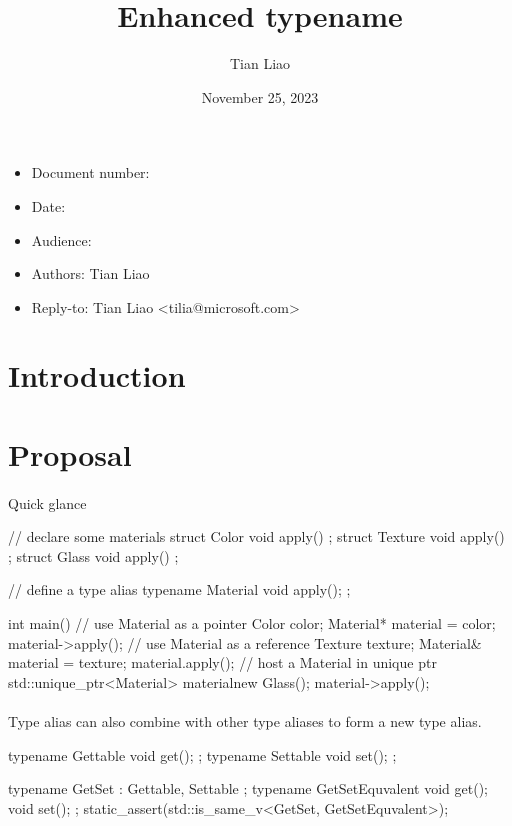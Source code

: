 \documentclass{article}
\title{Enhanced typename}
\author{Tian Liao}
\date{November 25, 2023}
\begin{document}
\maketitle
\vfill
\begin{itemize}[noitemsep]
  \item[] Document number:
  \item[] Date:
  \item[] Audience:
  \item[] Authors: Tian Liao
  \item[] Reply-to: Tian Liao \textless tilia@microsoft.com\textgreater
\end{itemize}

\newpage
{}

\section{Introduction}

\section{Proposal}

\paragraph{}
Quick glance
\begin{codeblock}
// declare some materials
struct Color { void apply() {} };
struct Texture { void apply() {} };
struct Glass { void apply() {} };

// define a type alias
typename Material { void apply(); };

int main() {
  {
    // use Material as a pointer
    Color color;
    Material* material = color;
    material->apply();
  }
  {
    // use Material as a reference
    Texture texture;
    Material& material = texture;
    material.apply();
  }
  {
    // host a Material in unique ptr
    std::unique_ptr<Material> material{new Glass()};
    material->apply();
  }
}
\end{codeblock}

\paragraph{}
Type alias can also combine with other type aliases to form a new type alias.
\begin{codeblock}
typename Gettable{ void get(); };
typename Settable{ void set(); };

typename GetSet : Gettable, Settable {};
typename GetSetEquvalent {
  void get();
  void set();
};
static_assert(std::is_same_v<GetSet, GetSetEquvalent>);
\end{codeblock}
\end{document}
